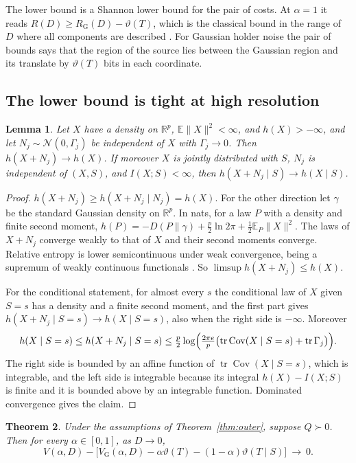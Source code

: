 \documentclass[11pt,onecolumn]{IEEEtran}
\newtheorem{theorem}{Theorem}
\newtheorem{lemma}[theorem]{Lemma}
\newcommand{\E}{\mathbb{E}}
\newcommand{\R}{\mathbb{R}}
\newcommand{\tr}{\operatorname{tr}}
\newcommand{\Cov}{\operatorname{Cov}}
\newcommand{\VG}{V_{\mathrm G}}
\begin{document}
The lower bound is a Shannon lower bound for the pair of costs. At
$\alpha=1$ it reads $R(D)\ge R_{\mathrm G}(D)-\vartheta(T)$, which is the
classical bound in the range of $D$ where all components are
described \cite{berger1971}. For Gaussian holder noise the pair of
bounds says that the region of the source lies between the Gaussian
region and its translate by $\vartheta(T)$ bits in each coordinate.

\subsection{The lower bound is tight at high resolution}

\begin{lemma}\label{lem:entropy}
Let $X$ have a density on $\R^p$, $\E\|X\|^2<\infty$, and
$h(X)>-\infty$, and let $N_j\sim\mathcal N(0,\Gamma_j)$ be independent
of $X$ with $\Gamma_j\to0$. Then $h(X+N_j)\to h(X)$. If moreover $X$ is
jointly distributed with $S$, $N_j$ is independent of $(X,S)$, and
$I(X;S)<\infty$, then $h(X+N_j\mid S)\to h(X\mid S)$.
\end{lemma}

\begin{proof}
$h(X+N_j)\ge h(X+N_j\mid N_j)=h(X)$. For the other direction let
$\gamma$ be the standard Gaussian density on $\R^p$. In nats, for a
law $P$ with a density and finite second moment,
$h(P)=-D(P\|\gamma)+\tfrac p2\ln2\pi+\tfrac12\E_P\|X\|^2$. The laws of
$X+N_j$ converge weakly to that of $X$ and their second moments
converge. Relative entropy is lower semicontinuous under weak
convergence, being a supremum of weakly continuous functionals
\cite{gray1990eit}. So $\limsup h(X+N_j)\le h(X)$.

For the conditional statement, for almost every $s$ the conditional
law of $X$ given $S=s$ has a density and a finite second moment, and
the first part gives $h(X+N_j\mid S=s)\to h(X\mid S=s)$, also when the
right side is $-\infty$. Moreover
\[
h(X\mid S=s)\le h(X+N_j\mid S=s)\le\tfrac p2\log\Bigl(\tfrac{2\pi e}{p}\bigl(\tr\Cov(X\mid S=s)+\tr\Gamma_j\bigr)\Bigr).
\]
The right side is bounded by an affine function of
$\tr\Cov(X\mid S=s)$, which is integrable, and the left side is
integrable because its integral $h(X)-I(X;S)$ is finite and it is
bounded above by an integrable function. Dominated convergence gives
the claim.
\end{proof}

\begin{theorem}\label{thm:highres}
Under the assumptions of Theorem~\ref{thm:outer}, suppose $Q\succ0$.
Then for every $\alpha\in[0,1]$, as $D\to0$,
\[
V(\alpha,D)-\bigl[\VG(\alpha,D)-\alpha\vartheta(T)-(1-\alpha)\vartheta(T\mid S)\bigr]\ \to\ 0 .
\]
\end{theorem}
\end{document}

